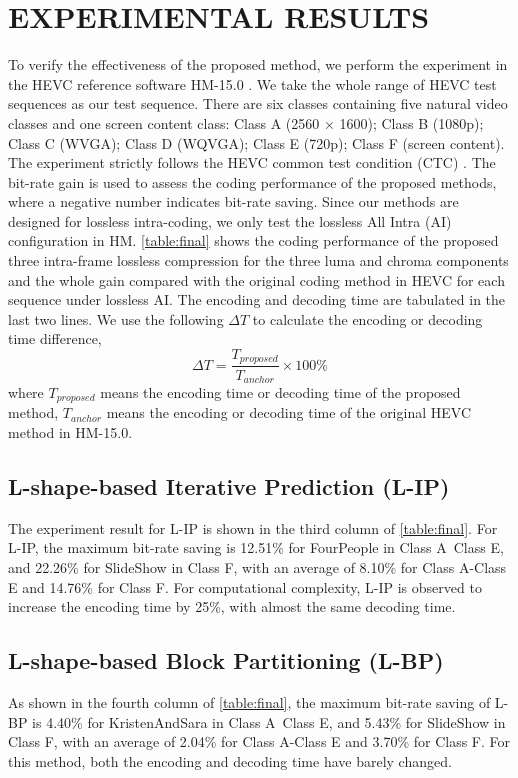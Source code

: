 \documentclass[journal]{IEEEtran}
\begin{document}
\section{EXPERIMENTAL RESULTS}
To verify the effectiveness of the proposed method, we perform the experiment in the HEVC reference software HM-15.0 \cite{30}. We take the whole range of HEVC test sequences as our test sequence. There are six classes containing five natural video classes and one screen content class: Class A (2560 × 1600); Class B (1080p); Class C (WVGA); Class D (WQVGA); Class E (720p); Class F (screen content). The experiment strictly follows the HEVC common test condition (CTC) \cite{31}. The bit-rate gain is used to assess the coding performance of the proposed methods, where a negative number indicates bit-rate saving. Since our methods are designed for lossless intra-coding, we only test the lossless All Intra (AI) configuration in HM. \autoref{table:final} shows the coding performance of the proposed three intra-frame lossless compression for the three luma and chroma components and the whole gain compared with the original coding method in HEVC for each sequence under lossless AI. The encoding and decoding time are tabulated in the last two lines. We use the following $\Delta T$ to calculate the encoding or decoding time difference,
\begin{equation}
\Delta T=\frac{T_{proposed}}{T_{anchor}} \times 100\%
\end{equation}
where $T_{proposed}$ means the encoding time or decoding time of the proposed method, $T_{anchor}$ means the encoding or decoding time of the original HEVC method in HM-15.0.
\subsection{L-shape-based Iterative Prediction (L-IP)}
The experiment result for L-IP is shown in the third column of \autoref{table:final}. For L-IP, the maximum bit-rate saving is 12.51\% for FourPeople in Class A~Class E, and 22.26\% for SlideShow in Class F, with an average of 8.10\% for Class A-Class E and 14.76\% for Class F. For computational complexity, L-IP is observed to increase the encoding time by 25\%, with almost the same decoding time.
 
\subsection{L-shape-based Block Partitioning (L-BP)}
As shown in the fourth column of \autoref{table:final}, the maximum bit-rate saving of L-BP is 4.40\% for KristenAndSara in Class A~Class E, and 5.43\% for SlideShow in Class F, with an average of 2.04\% for Class A-Class E and 3.70\% for Class F. For this method, both the encoding and decoding time have barely changed.
\end{document}
